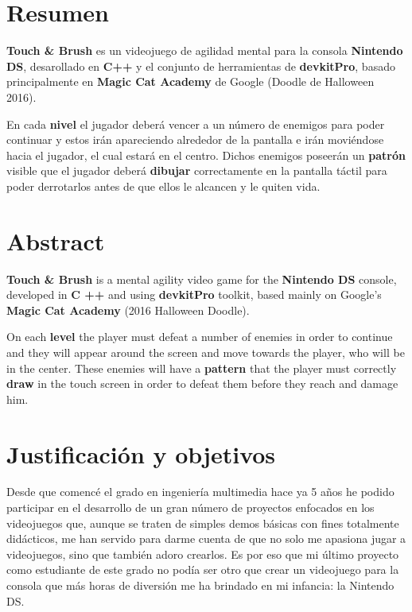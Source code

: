 
\chapter{Resumen}
\textbf{Touch \& Brush} es un videojuego de agilidad mental para la consola \textbf{Nintendo DS}, desarollado en \textbf{C++} y el conjunto de herramientas de \textbf{devkitPro}, basado principalmente en \textbf{Magic Cat Academy} de Google (Doodle de Halloween 2016).

\vspace{0.5cm}

En cada \textbf{nivel}  el jugador deberá vencer a un número de enemigos para poder continuar y estos irán apareciendo alrededor de la pantalla e irán moviéndose hacia el jugador, el cual estará en el centro. Dichos enemigos poseerán un \textbf{patrón} visible que el jugador deberá \textbf{dibujar} correctamente en la pantalla táctil para poder derrotarlos antes de que ellos le alcancen y le quiten vida.

{\let\clearpage\relax\chapter*{Abstract}}
\textbf{Touch \& Brush} is a mental agility video game for the \textbf{Nintendo DS} console, developed in \textbf{C ++} and using \textbf{devkitPro} toolkit, based mainly on Google's \textbf{Magic Cat Academy} (2016 Halloween Doodle).

\vspace{0.5cm}

On each \textbf{level} the player must defeat a number of enemies in order to continue and they will appear around the screen and move towards the player, who will be in the center. These enemies will have a \textbf{pattern} that the player must correctly \textbf{draw} in the touch screen in order to defeat them before they reach  and damage him.


\chapter{Justificación y objetivos}
\thispagestyle{empty}
Desde que comencé el grado en ingeniería multimedia hace ya 5 años he podido participar en el desarrollo de un gran número de proyectos enfocados en los videojuegos que, aunque se traten de simples demos básicas con fines totalmente didácticos, me han servido para darme cuenta de que no solo me apasiona jugar a videojuegos, sino que también adoro crearlos. Es por eso que mi último proyecto como estudiante de este grado no podía ser otro que crear un videojuego para la consola que más horas de diversión me ha brindado en mi infancia: la Nintendo DS.

